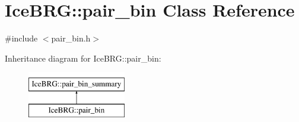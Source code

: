 \hypertarget{classIceBRG_1_1pair__bin}{\section{Ice\-B\-R\-G\-:\-:pair\-\_\-bin Class Reference}
\label{classIceBRG_1_1pair__bin}
}


{\ttfamily \#include $<$pair\-\_\-bin.\-h$>$}

Inheritance diagram for Ice\-B\-R\-G\-:\-:pair\-\_\-bin\-:\begin{figure}[H]
\begin{center}
\leavevmode
\includegraphics[height=2.000000cm]{classIceBRG_1_1pair__bin}
\end{center}
\end{figure}
